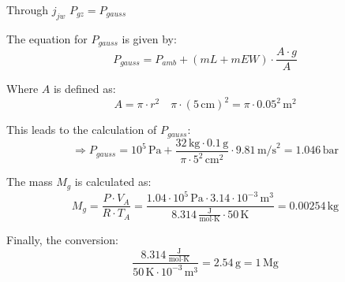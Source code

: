 Through \( j_{jw} \) \( P_{gz} = P_{gauss} \)

The equation for \( P_{gauss} \) is given by:
\[ P_{gauss} = P_{amb} + (mL + mEW) \cdot \frac{A \cdot g}{A} \]

Where \( A \) is defined as:
\[ A = \pi \cdot r^2 \quad \pi \cdot (5 \, \text{cm})^2 = \pi \cdot 0.05^2 \, \text{m}^2 \]

This leads to the calculation of \( P_{gauss} \):
\[ \Rightarrow P_{gauss} = 10^5 \, \text{Pa} + \frac{32 \, \text{kg} \cdot 0.1 \, \text{g}}{\pi \cdot 5^2 \, \text{cm}^2} \cdot 9.81 \, \text{m/s}^2 = 1.046 \, \text{bar} \]

The mass \( M_g \) is calculated as:
\[ M_g = \frac{P \cdot V_A}{R \cdot T_A} = \frac{1.04 \cdot 10^5 \, \text{Pa} \cdot 3.14 \cdot 10^{-3} \, \text{m}^3}{8.314 \, \frac{\text{J}}{\text{mol} \cdot \text{K}} \cdot 50 \, \text{K}} = 0.00254 \, \text{kg} \]

Finally, the conversion:
\[ \frac{8.314 \, \frac{\text{J}}{\text{mol} \cdot \text{K}}}{50 \, \text{K} \cdot 10^{-3} \, \text{m}^3} = 2.54 \, \text{g} = 1 \, \text{Mg} \]